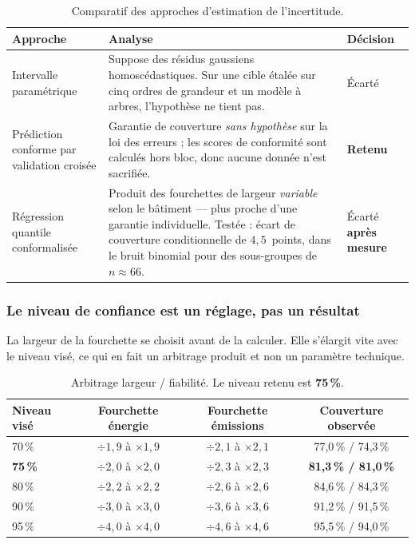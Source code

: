\begin{table}[H]
\centering
\small
\begin{tabularx}{\linewidth}{@{}L{4.2cm}XL{2.9cm}@{}}
\toprule
\textbf{Approche} & \textbf{Analyse} & \textbf{Décision} \\
\midrule
Intervalle paramétrique &
Suppose des résidus gaussiens homoscédastiques. Sur une cible étalée sur cinq
ordres de grandeur et un modèle à arbres, l'hypothèse ne tient pas. &
Écarté \\
\addlinespace
Prédiction conforme par validation croisée &
Garantie de couverture \emph{sans hypothèse} sur la loi des erreurs ; les scores
de conformité sont calculés hors bloc, donc aucune donnée n'est sacrifiée. &
\textbf{Retenu} \\
\addlinespace
Régression quantile conformalisée &
Produit des fourchettes de largeur \emph{variable} selon le bâtiment — plus
proche d'une garantie individuelle. Testée : écart de couverture conditionnelle
de $4{,}5$~points, dans le bruit binomial pour des sous-groupes de $n \approx 66$. &
Écarté \textbf{après mesure} \\
\bottomrule
\end{tabularx}
\caption{Comparatif des approches d'estimation de l'incertitude.}
\end{table}

\subsubsection*{Le niveau de confiance est un réglage, pas un résultat}

La largeur de la fourchette se choisit avant de la calculer. Elle s'élargit vite
avec le niveau visé, ce qui en fait un arbitrage produit et non un paramètre
technique.

\begin{table}[H]
\centering
\small
\begin{tabular}{@{}lccc@{}}
\toprule
\textbf{Niveau visé} & \textbf{Fourchette énergie} & \textbf{Fourchette émissions} & \textbf{Couverture observée} \\
\midrule
70\,\%          & $\div1{,}9$ à $\times1{,}9$ & $\div2{,}1$ à $\times2{,}1$ & 77,0\,\% / 74,3\,\% \\
\textbf{75\,\%} & $\div2{,}0$ à $\times2{,}0$ & $\div2{,}3$ à $\times2{,}3$ & \textbf{81,3\,\% / 81,0\,\%} \\
80\,\%          & $\div2{,}2$ à $\times2{,}2$ & $\div2{,}6$ à $\times2{,}6$ & 84,6\,\% / 84,3\,\% \\
90\,\%          & $\div3{,}0$ à $\times3{,}0$ & $\div3{,}6$ à $\times3{,}6$ & 91,2\,\% / 91,5\,\% \\
95\,\%          & $\div4{,}0$ à $\times4{,}0$ & $\div4{,}6$ à $\times4{,}6$ & 95,5\,\% / 94,0\,\% \\
\bottomrule
\end{tabular}
\caption{Arbitrage largeur / fiabilité. Le niveau retenu est \textbf{75\,\%}.}
\end{table}

